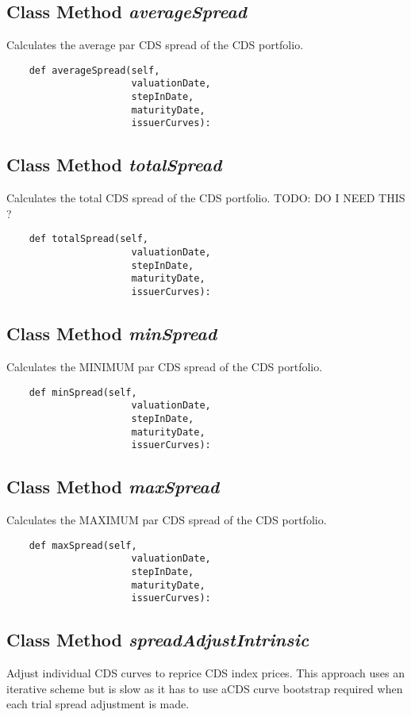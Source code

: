 \documentclass[twoside,11pt]{book}
\begin{document}
\subsection{Class Method {\it averageSpread}}
Calculates the average par CDS spread of the CDS portfolio. 

\begin{lstlisting}
    def averageSpread(self, 
                      valuationDate,
                      stepInDate,
                      maturityDate,
                      issuerCurves):
\end{lstlisting}

\subsection{Class Method {\it totalSpread}}
Calculates the total CDS spread of the CDS portfolio. TODO: DO I NEED THIS ? 

\begin{lstlisting}
    def totalSpread(self, 
                      valuationDate,
                      stepInDate,
                      maturityDate,
                      issuerCurves):
\end{lstlisting}

\subsection{Class Method {\it minSpread}}
Calculates the MINIMUM par CDS spread of the CDS portfolio. 

\begin{lstlisting}
    def minSpread(self, 
                      valuationDate,
                      stepInDate,
                      maturityDate,
                      issuerCurves):
\end{lstlisting}

\subsection{Class Method {\it maxSpread}}
Calculates the MAXIMUM par CDS spread of the CDS portfolio. 

\begin{lstlisting}
    def maxSpread(self, 
                      valuationDate,
                      stepInDate,
                      maturityDate,
                      issuerCurves):
\end{lstlisting}

\subsection{Class Method {\it spreadAdjustIntrinsic}}
Adjust individual CDS curves to reprice CDS index prices. This approach uses an iterative scheme but is slow as it has to use aCDS curve bootstrap required when each trial spread adjustment is made.
\end{document}
